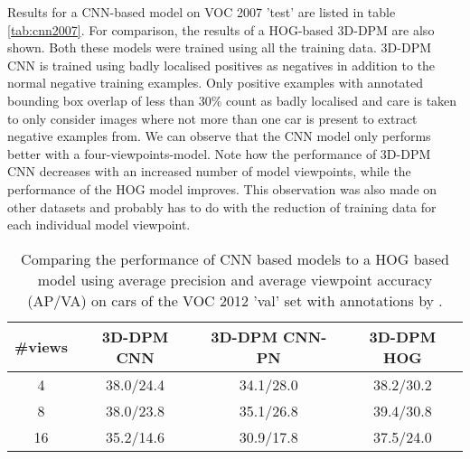 Results for a CNN-based model on VOC 2007 'test' are listed in table \ref{tab:cnn2007}. For comparison, the results of a HOG-based 3D-DPM are also shown. Both these models were trained using all the training data. 3D-DPM CNN is trained using badly localised positives as negatives in addition to the normal negative training examples. Only positive examples with annotated bounding box overlap of less than 30\% count as badly localised and care is taken to only consider images where not more than one car is present to extract negative examples from. We can observe that the CNN model only performs better with a four-viewpoints-model. Note how the performance of 3D-DPM CNN decreases with an increased number of model viewpoints, while the performance of the HOG model improves. This observation was also made on other datasets and probably has to do with the reduction of training data for each individual model viewpoint. 


\begin{table}[]
	\begin{center}
		\begin{tabular}{|c|c|c|c|}
		\hline
		\#views & 3D-DPM CNN & 3D-DPM CNN-PN & 3D-DPM HOG\\
		\hline\hline
		4 &  38.0/24.4 & 34.1/28.0 & 38.2/30.2\\
		\hline
		8 & 38.0/23.8  & 35.1/26.8 &  39.4/30.8\\
		\hline
		16 & 35.2/14.6 & 30.9/17.8 & 37.5/24.0\\
		\hline
		\end{tabular}
	\end{center}
\caption{Comparing the performance of CNN based models to a HOG based model using average precision and average viewpoint accuracy (AP/VA) on cars of the VOC 2012 'val' set with annotations by \cite{xiang_wacv14}.}\label{tab:cnn2012}
\end{table}

